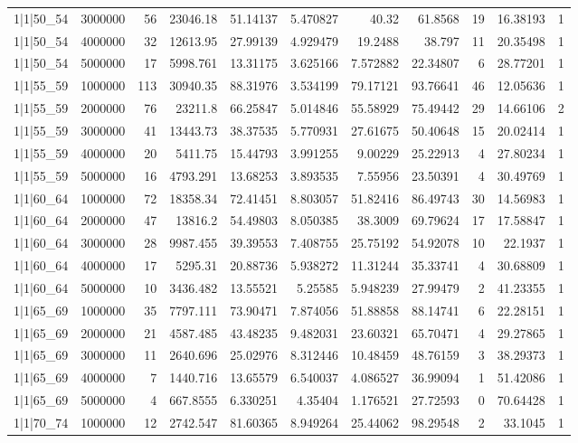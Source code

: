 \begin{tabular}{lrrrrrrrrrr}
1|1|50\_54 & 3000000 & 56 & 23046.18 & 51.14137 & 5.470827 & 40.32 & 61.8568 & 19 & 16.38193 & 1 \\
1|1|50\_54 & 4000000 & 32 & 12613.95 & 27.99139 & 4.929479 & 19.2488 & 38.797 & 11 & 20.35498 & 1 \\
1|1|50\_54 & 5000000 & 17 & 5998.761 & 13.31175 & 3.625166 & 7.572882 & 22.34807 & 6 & 28.77201 & 1 \\
1|1|55\_59 & 1000000 & 113 & 30940.35 & 88.31976 & 3.534199 & 79.17121 & 93.76641 & 46 & 12.05636 & 1 \\
1|1|55\_59 & 2000000 & 76 & 23211.8 & 66.25847 & 5.014846 & 55.58929 & 75.49442 & 29 & 14.66106 & 2 \\
1|1|55\_59 & 3000000 & 41 & 13443.73 & 38.37535 & 5.770931 & 27.61675 & 50.40648 & 15 & 20.02414 & 1 \\
1|1|55\_59 & 4000000 & 20 & 5411.75 & 15.44793 & 3.991255 & 9.00229 & 25.22913 & 4 & 27.80234 & 1 \\
1|1|55\_59 & 5000000 & 16 & 4793.291 & 13.68253 & 3.893535 & 7.55956 & 23.50391 & 4 & 30.49769 & 1 \\
1|1|60\_64 & 1000000 & 72 & 18358.34 & 72.41451 & 8.803057 & 51.82416 & 86.49743 & 30 & 14.56983 & 1 \\
1|1|60\_64 & 2000000 & 47 & 13816.2 & 54.49803 & 8.050385 & 38.3009 & 69.79624 & 17 & 17.58847 & 1 \\
1|1|60\_64 & 3000000 & 28 & 9987.455 & 39.39553 & 7.408755 & 25.75192 & 54.92078 & 10 & 22.1937 & 1 \\
1|1|60\_64 & 4000000 & 17 & 5295.31 & 20.88736 & 5.938272 & 11.31244 & 35.33741 & 4 & 30.68809 & 1 \\
1|1|60\_64 & 5000000 & 10 & 3436.482 & 13.55521 & 5.25585 & 5.948239 & 27.99479 & 2 & 41.23355 & 1 \\
1|1|65\_69 & 1000000 & 35 & 7797.111 & 73.90471 & 7.874056 & 51.88858 & 88.14741 & 6 & 22.28151 & 1 \\
1|1|65\_69 & 2000000 & 21 & 4587.485 & 43.48235 & 9.482031 & 23.60321 & 65.70471 & 4 & 29.27865 & 1 \\
1|1|65\_69 & 3000000 & 11 & 2640.696 & 25.02976 & 8.312446 & 10.48459 & 48.76159 & 3 & 38.29373 & 1 \\
1|1|65\_69 & 4000000 & 7 & 1440.716 & 13.65579 & 6.540037 & 4.086527 & 36.99094 & 1 & 51.42086 & 1 \\
1|1|65\_69 & 5000000 & 4 & 667.8555 & 6.330251 & 4.35404 & 1.176521 & 27.72593 & 0 & 70.64428 & 1 \\
1|1|70\_74 & 1000000 & 12 & 2742.547 & 81.60365 & 8.949264 & 25.44062 & 98.29548 & 2 & 33.1045 & 1 \\

\end{tabular}
